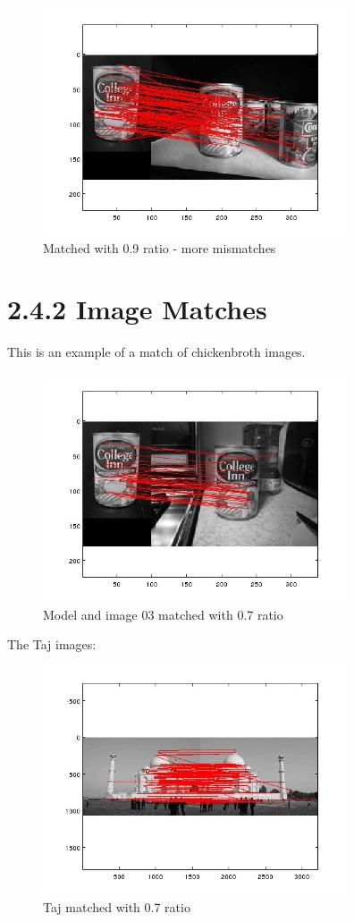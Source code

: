 \documentclass[11pt]{article}
\begin{document}
\begin{figure}[H]
\centering
\includegraphics[width=90mm]{ratiopoint9.jpg}
\caption{Matched with 0.9 ratio - more mismatches}
\end{figure}

\section*{2.4.2 Image Matches}
This is an example of a match of chickenbroth images.
\begin{figure}[H]
\centering
\includegraphics[width=90mm]{model_to_3.jpg}
\caption{Model and image 03 matched with 0.7 ratio}
\end{figure}

The Taj images:
\begin{figure}[H]
\centering
\includegraphics[width=90mm]{taj.jpg}
\caption{Taj matched with 0.7 ratio \label{taj}}
\end{figure}
\end{document}
